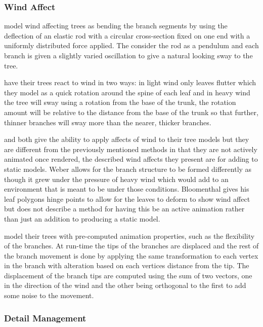 \documentclass[review]{cmpreport}
\begin{document}
\subsubsection{Wind Affect}
\cite{weber1995rendering} model wind affecting trees as bending the branch segments by using 
the deflection of an elastic rod with a circular cross-section fixed on one end with a 
uniformly distributed force applied. The consider the rod as a pendulum and each branch is 
given a slightly varied oscillation to give a natural looking sway to the tree. \par
\cite{wesslen2005real} have their trees react to wind in two ways: in light wind only leaves 
flutter which they model as a quick rotation around the spine of each leaf and in heavy 
wind the tree will sway using a rotation from the base of the trunk, the rotation amount will 
be relative to the distance from the base of the trunk so that further, thinner branches will 
sway more than the nearer, thicker branches. \par
\cite{weber2008simulation} and \cite{bloomenthal1985modeling} both give the ability to apply 
affects of wind to their tree models but they are different from the previously mentioned methods 
in that they are not actively animated once rendered, the described wind affects they present 
are for adding to static models. Weber allows for the branch structure to be formed differently 
as though it grew under the pressure of heavy wind which would add to an environment that is 
meant to be under those conditions. Bloomenthal gives his leaf polygons hinge points to allow 
for the leaves to deform to show wind affect but does not describe a method for having this 
be an active animation rather than just an addition to producing a static model. \par 
\cite{candussi2005rendering} model their trees with pre-computed animation properties, such as 
the flexibility of the branches. At run-time the tips of the branches are displaced and the rest 
of the branch movement is done by applying the same transformation to each vertex in the branch 
with alteration based on each vertices distance from the tip. The displacement of the branch tips 
are computed using the sum of two vectors, one in the direction of the wind and the other 
being orthogonal to the first to add some noise to the movement.

\subsubsection{Detail Management}

\clearpage

\end{document}
